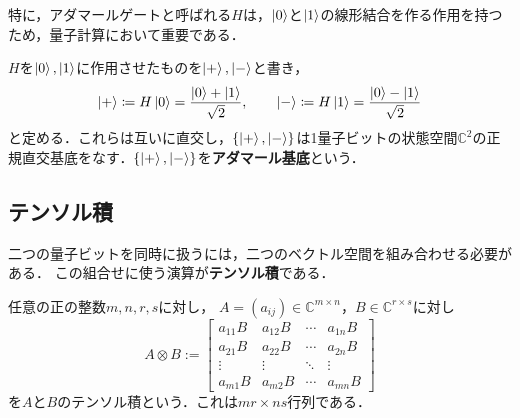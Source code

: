 特に，アダマールゲートと呼ばれる$H$は，$\ket{0}$と$\ket{1}$の線形結合を作る作用を持つため，量子計算において重要である．
\begin{defi}[アダマール基底]
  $H$を$\ket{0}, \ket{1}$に作用させたものを$\ket{+}, \ket{-}$と書き，
  \begin{equation*}
    \ket{+}\coloneq H\ket{0}=\frac{\ket{0}+\ket{1}}{\sqrt2},
    \qquad
    \ket{-} \coloneq H\ket{1}=\frac{\ket{0}-\ket{1}}{\sqrt2}
  \end{equation*}
  と定める．これらは互いに直交し，$\{\ket{+},\ket{-}\}$は1量子ビットの状態空間$\mathbb C^2$の正規直交基底をなす．$\{\ket{+},\ket{-}\}$を\textbf{アダマール基底}という．
\end{defi}

\subsection{テンソル積}

二つの量子ビットを同時に扱うには，二つのベクトル空間を組み合わせる必要がある．
この組合せに使う演算が\textbf{テンソル積}である．

\begin{defi}[行列のテンソル積]
  任意の正の整数$m,n,r,s$に対し，
  $A=(a_{ij})\in\mathbb{C}^{m\times n}$，$B\in\mathbb{C}^{r\times s}$に対し
  \begin{equation*}
    A\otimes B
    :=
    \begin{bmatrix}
      a_{11}B & a_{12}B & \cdots & a_{1n}B \\
      a_{21}B & a_{22}B & \cdots & a_{2n}B \\
      \vdots  & \vdots  & \ddots & \vdots  \\
      a_{m1}B & a_{m2}B & \cdots & a_{mn}B
    \end{bmatrix}
  \end{equation*}
  を$A$と$B$のテンソル積という．これは$mr\times ns$行列である．
\end{defi}


